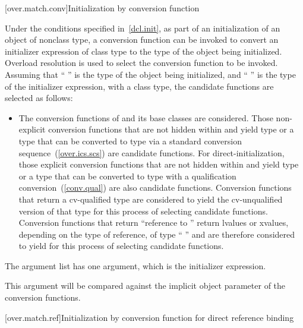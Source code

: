 [over.match.conv]{Initialization by conversion function}%

\pnum
Under the conditions specified in~\ref{dcl.init}, as
part of an initialization of an object of nonclass type,
a conversion function can be invoked to convert an initializer
expression of class type to the type of the object
being initialized.
Overload resolution is used to select the
conversion function to be invoked.
Assuming that `` '' is the
type of the object being initialized, and ``\cv{} '' is the type
of the initializer expression, with
a class type,
the candidate functions are selected as follows:

\begin{itemize}
\item
The conversion functions of
and its base classes are considered.
Those non-explicit conversion functions that are not hidden
within
and yield type
or a type that can be converted to type
via a standard conversion sequence~(\ref{over.ics.scs})
are candidate functions.
For direct-initialization, those explicit conversion functions that are not
hidden within  and yield type  or a type that can be converted
to type  with a qualification conversion~(\ref{conv.qual}) are also
candidate functions.
Conversion functions that return a cv-qualified type
are considered to yield the cv-unqualified version of that type
for this process of selecting candidate functions.
Conversion functions that return ``reference to
''
return
lvalues or xvalues, depending on the type of reference, of type
``
''
and are therefore considered to yield
for this
process of selecting candidate functions.
\end{itemize}

\pnum
The argument list has one argument, which is the initializer expression.
\begin{note}
This argument will be compared against
the implicit object parameter of the conversion functions.
\end{note}

[over.match.ref]{Initialization by conversion function for direct reference binding}%

